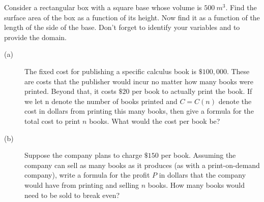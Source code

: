 \begin{ProblemSection}
  \begin{problem}{}
    Consider a rectangular box with a square base whose volume is
    $500~ m^3.$ Find the surface area of the box as a function of its
    height.  Now find it as a function of the length of the side of
    the base.  Don't forget to identify your variables and to provide
    the domain.
  \end{problem}
  \begin{problem}{}
    \begin{description}
    \item[(a)] The fixed cost for publishing a specific calculus book
      is $\$100,000.$ These are costs that the publisher would incur
      no matter how many books were printed.  Beyond that, it costs
      $\$20$ per book to actually print the book.  If we let n denote
      the number of books printed and $C=C(n)$ denote the cost in
      dollars from printing this many books, then give a formula for
      the total cost to print $n$ books.  What would the cost per book
      be?
    \item[(b)] Suppose the company plans to charge $\$150$ per book.
      Assuming the company can sell as many books as it produces (as
      with a print-on-demand company), write a formula for the profit
      $P$ in dollars that the company would have from printing and
      selling $n$ books.  How many books would need to be sold to
      break even?
    \end{description}
  \end{problem}
\end{ProblemSection}
